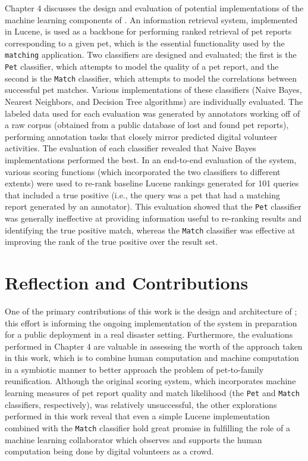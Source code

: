 Chapter 4 discusses the design and evaluation of potential implementations of the machine learning components of \nplh.  An information retrieval system, implemented in Lucene, is used as a backbone for performing ranked retrieval of pet reports corresponding to a given pet, which is the essential functionality used by the {\tt matching} application.  Two classifiers are designed and evaluated; the first is the {\tt Pet} classifier, which attempts to model the quality of a pet report, and the second is the {\tt Match} classifier, which attempts to model the correlations between successful pet matches.  Various implementations of these classifiers (Naive Bayes, Nearest Neighbors, and Decision Tree algorithms) are individually evaluated.  The labeled data used for each evaluation was generated by annotators working off of a raw corpus (obtained from a public database of lost and found pet reports), performing annotation tasks that closely mirror predicted digital volunteer activities.  The evaluation of each classifier revealed that Naive Bayes implementations performed the best.  In an end-to-end evaluation of the system, various scoring functions (which incorporated the two classifiers to different extents) were used to re-rank baseline Lucene rankings generated for 101 queries that included a true positive (i.e., the query was a pet that had a matching report generated by an annotator).  This evaluation showed that the {\tt Pet} classifier was generally ineffective at providing information useful to re-ranking results and identifying the true positive match, whereas the {\tt Match} classifier was effective at improving the rank of the true positive over the result set.

\section {Reflection and Contributions}

One of the primary contributions of this work is the design and architecture of \nplh; this effort is informing the ongoing implementation of the system in preparation for a public deployment in a real disaster setting.  Furthermore, the evaluations performed in Chapter 4 are valuable in assessing the worth of the approach taken in this work, which is to combine human computation and machine computation in a symbiotic manner to better approach the problem of pet-to-family reunification.  Although the original scoring system, which incorporates machine learning measures of pet report quality and match likelihood (the {\tt Pet} and {\tt Match} classifiers, respectively), was relatively unsuccessful, the other explorations performed in this work reveal that even a simple Lucene implementation combined with the {\tt Match} classifier hold great promise in fulfilling the role of a machine learning collaborator which observes and supports the human computation being done by digital volunteers as a crowd.

